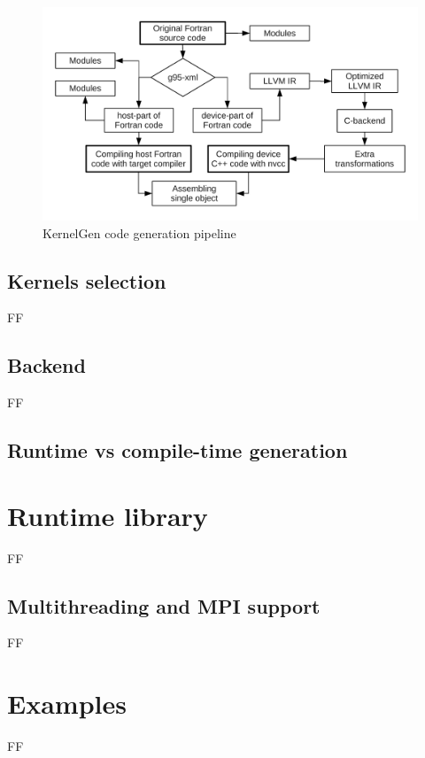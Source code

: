 \documentclass[a4,12pt]{article}
\begin{document}
\begin{figure}
\centering
\includegraphics[scale=0.5]{figures/pipeline.pdf}
\caption{KernelGen code generation pipeline}
\label{fig:pipeline}
\end{figure}

\subsection{Kernels selection}

FF

\subsection{Backend}

FF

\subsection{Runtime vs compile-time generation}

\section{Runtime library}

FF

\subsection{Multithreading and MPI support}

FF

\section{Examples}

FF
\end{document}
